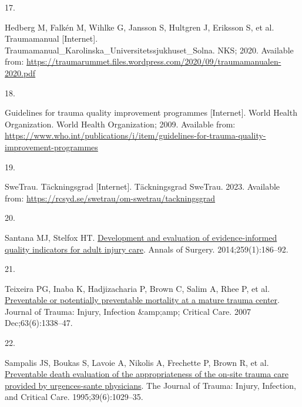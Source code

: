 \documentclass[
]{article}
\newlength{\cslhangindent}
\newlength{\csllabelwidth}
\newlength{\cslentryspacingunit} %
\newenvironment{CSLReferences}[2] %
 {%
  \setlength{\parindent}{0pt}
  \ifodd #1
  \let\oldpar\par
  \def\par{\hangindent=\cslhangindent\oldpar}
  \fi
  \setlength{\parskip}{#2\cslentryspacingunit}
 }%
 {}
\newcommand{\CSLLeftMargin}[1]{\parbox[t]{\csllabelwidth}{#1}}
\newcommand{\CSLRightInline}[1]{\parbox[t]{\linewidth - \csllabelwidth}{#1}\break}
\begin{document}
\begin{CSLReferences}{0}{0}
\leavevmode{}%
\CSLLeftMargin{17. }%
\CSLRightInline{Hedberg M, Falkén M, Wihlke G, Jansson S, Hultgren J,
Eriksson S, et al. Traumamanual {[}Internet{]}.
Traumamanual\_Karolinska\_Universitetssjukhuset\_Solna. NKS; 2020.
Available from:
\url{https://traumarummet.files.wordpress.com/2020/09/traumamanualen-2020.pdf}}

\leavevmode{}%
\CSLLeftMargin{18. }%
\CSLRightInline{Guidelines for trauma quality improvement programmes
{[}Internet{]}. World Health Organization. World Health Organization;
2009. Available from:
\url{https://www.who.int/publications/i/item/guidelines-for-trauma-quality-improvement-programmes}}

\leavevmode{}%
\CSLLeftMargin{19. }%
\CSLRightInline{SweTrau. Täckningsgrad {[}Internet{]}. Täckningsgrad
\textbar{} SweTrau. 2023. Available from:
\url{https://rcsyd.se/swetrau/om-swetrau/tackningsgrad}}

\leavevmode{}%
\CSLLeftMargin{20. }%
\CSLRightInline{Santana MJ, Stelfox HT.
\href{https://doi.org/10.1097/sla.0b013e31828df98e}{Development and
evaluation of evidence-informed quality indicators for adult injury
care}. Annals of Surgery. 2014;259(1):186--92. }

\leavevmode{}%
\CSLLeftMargin{21. }%
\CSLRightInline{Teixeira PG, Inaba K, Hadjizacharia P, Brown C, Salim A,
Rhee P, et al.
\href{https://doi.org/10.1097/ta.0b013e31815078ae}{Preventable or
potentially preventable mortality at a mature trauma center}. Journal of
Trauma: Injury, Infection \&amp;amp; Critical Care. 2007
Dec;63(6):1338--47. }

\leavevmode{}%
\CSLLeftMargin{22. }%
\CSLRightInline{Sampalis JS, Boukas S, Lavoie A, Nikolis A, Frechette P,
Brown R, et al.
\href{https://doi.org/10.1097/00005373-199512000-00002}{Preventable
death evaluation of the appropriateness of the on-site trauma care
provided by urgences-sante physicians}. The Journal of Trauma: Injury,
Infection, and Critical Care. 1995;39(6):1029--35. }

\end{CSLReferences}
\end{document}
